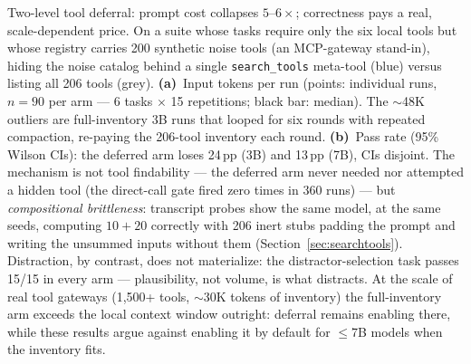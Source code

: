 \caption{Two-level tool deferral: prompt cost collapses $5$--$6\times$;
correctness pays a real, scale-dependent price. On a suite whose tasks
require only the six local tools but whose registry carries 200
synthetic noise tools (an MCP-gateway stand-in), hiding the noise
catalog behind a single \texttt{search\_tools} meta-tool (blue) versus
listing all 206 tools (grey). \textbf{(a)}~Input tokens per run
(points: individual runs, $n{=}90$ per arm --- 6 tasks $\times$ 15
repetitions; black bar: median). The ${\sim}$48K outliers are
full-inventory 3B runs that looped for six rounds with repeated
compaction, re-paying the 206-tool inventory each round.
\textbf{(b)}~Pass rate (95\% Wilson CIs): the deferred arm loses
24\,pp (3B) and 13\,pp (7B), CIs disjoint. The mechanism is not tool
findability — the deferred arm never needed nor attempted a hidden
tool (the direct-call gate fired zero times in 360 runs) — but
\emph{compositional brittleness}: transcript probes show the same
model, at the same seeds, computing $10{+}20$ correctly with 206 inert
stubs padding the prompt and writing the unsummed inputs without them
(Section~\ref{sec:searchtools}). Distraction, by contrast, does not materialize: the
distractor-selection task passes 15/15 in every arm — plausibility,
not volume, is what distracts. At the scale of real tool gateways
(1{,}500+ tools, $\sim$30K tokens of inventory) the full-inventory arm
exceeds the local context window outright: deferral remains enabling
there, while these results argue against enabling it by default for
$\leq$7B models when the inventory fits.}
